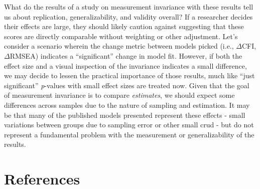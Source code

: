 \documentclass[
  man]{apa7}
\begin{document}
What do the results of a study on measurement invariance with these results tell us about replication, generalizability, and validity overall? If a researcher decides their effects are large, they should likely caution against suggesting that these scores are directly comparable without weighting or other adjustment. Let's consider a scenario wherein the change metric between models picked (i.e., \(\Delta\)CFI, \(\Delta\)RMSEA) indicates a ``significant'' change in model fit. However, if both the effect size and a visual inspection of the invariance indicates a small difference, we may decide to lessen the practical importance of those results, much like ``just significant'' \emph{p}-values with small effect sizes are treated now. Given that the goal of measurement invariance is to compare \emph{estimates}, we should expect some differences across samples due to the nature of sampling and estimation. It may be that many of the published models presented represent these effects - small variations between groups due to sampling error or other small crud - but do not represent a fundamental problem with the measurement or generalizability of the results.

\newpage

\hypertarget{references}{%
\section{References}\label{references}}
\end{document}
